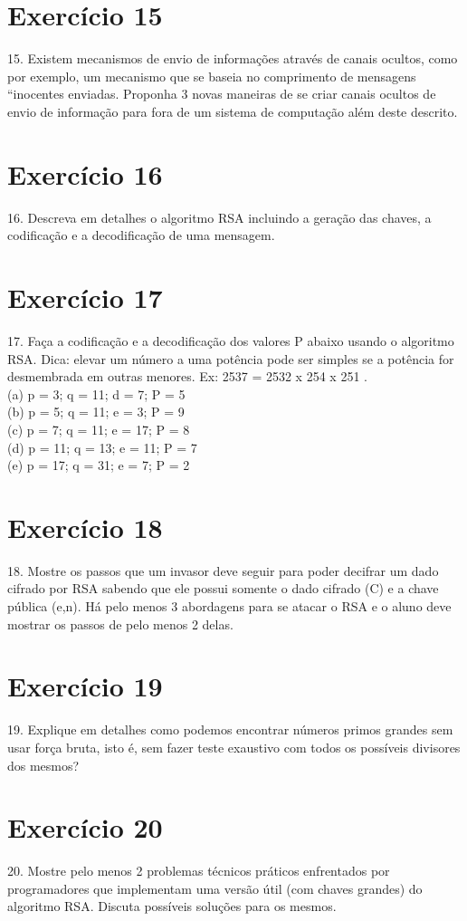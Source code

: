 \documentclass[10pt,a4paper]{article}
\begin{document}
\section*{Exercício 15}
15. Existem mecanismos de envio de informações através de canais ocultos, como por exemplo, um mecanismo que se baseia no comprimento de mensagens ``inocentes enviadas. Proponha 3 novas maneiras de se criar canais ocultos de envio de informação para fora de um sistema de computação além deste descrito.\\
\section*{Exercício 16}
16. Descreva em detalhes o algoritmo RSA incluindo a geração das chaves, a codificação e a decodificação de uma mensagem.\\
\section*{Exercício 17}
17. Faça a codificação e a decodificação dos valores P abaixo usando o algoritmo RSA. Dica: elevar um número a uma potência pode ser simples se a potência for desmembrada em outras menores. Ex: 2537 = 2532 x 254 x 251 .\\
(a) p = 3; q = 11; d = 7; P = 5\\
(b) p = 5; q = 11; e = 3; P = 9\\
(c) p = 7; q = 11; e = 17; P = 8\\
(d) p = 11; q = 13; e = 11; P = 7\\
(e) p = 17; q = 31; e = 7; P = 2\\
\section*{Exercício 18}
18. Mostre os passos que um invasor deve seguir para poder decifrar um dado cifrado por RSA sabendo que ele possui somente o dado cifrado (C) e a chave pública (e,n). Há pelo menos 3 abordagens para se atacar o RSA e o aluno deve mostrar os passos de pelo menos 2 delas.\\
\section*{Exercício 19}
19. Explique em detalhes como podemos encontrar números primos grandes sem usar força bruta, isto é, sem fazer teste exaustivo com todos os possíveis divisores dos mesmos?\\
\section*{Exercício 20}
20. Mostre pelo menos 2 problemas técnicos práticos enfrentados por programadores que implementam uma versão útil (com chaves grandes) do algoritmo RSA. Discuta possíveis soluções para os mesmos.\\
\end{document}
